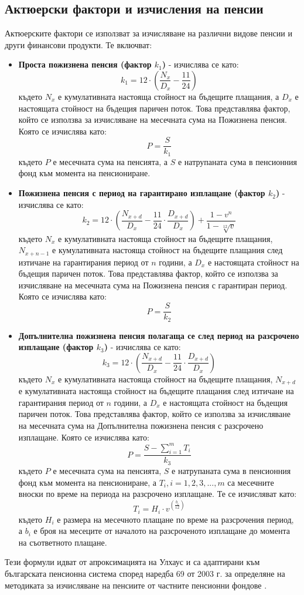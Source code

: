 \documentclass[a4paper,12pt]{article}
\begin{document}
\subsection{Актюерски фактори и изчисления на пенсии}
Актюерските фактори се използват за изчисляване на различни видове пенсии и други финансови продукти. Те включват:
\begin{itemize}
        \item \textbf{Проста пожизнена пенсия (фактор $k_1$)} - изчислява се като:
              \[k_1 = 12\cdot\left(\frac{N_{x}}{D_{x}}-\frac{11}{24}\right)\]
              където $N_x$ е кумулативната настояща стойност на бъдещите плащания, а $D_x$ е настоящата стойност на бъдещия паричен поток. Това представлява фактор, който се използва за изчисляване на месечната сума на Пожизнена пенсия. Която се изчислява като:
              \[P = \frac{S}{k_1}\]
              където $P$ е месечната сума на пенсията, а $S$ е натрупаната сума в пенсионния фонд към момента на пенсиониране.
        \item \textbf{Пожизнена пенсия с  период на гарантирано изплащане (фактор $k_2$)} - изчислява се като:
              \[k_2 = 12\cdot\left(\frac{N_{x+d}}{D_x} - \frac{11}{24}\cdot \frac{D_{x+d}}{D_{x}}\right)+\frac{1-v^n}{1-\sqrt[12]{v}}\]
              където $N_x$ е кумулативната настояща стойност на бъдещите плащания, $N_{x+n-1}$ е кумулативната настояща стойност на бъдещите плащания след изтичане на гарантирания период от $n$ години, а $D_x$ е настоящата стойност на бъдещия паричен поток. Това представлява фактор, който се използва за изчисляване на месечната сума на Пожизнена пенсия с гарантиран период. Която се изчислява като:
              \[P = \frac{S}{k_2}\]
        \item \textbf{Допълнителна пожизнена пенсия полагаща се след период на разсрочено изплащане (фактор $k_3$)} - изчислява се като:
              \[k_3 = 12\cdot\left(\frac{N_{x+d}}{D_{x}} - \frac{11}{24}\cdot\frac{
                              D_{x+d}}{D_{x}}\right)\]
              където $N_x$ е кумулативната настояща стойност на бъдещите плащания, $N_{x+d}$ е кумулативната настояща стойност на бъдещите плащания след изтичане на гарантирания период от $n$ години, а $D_x$ е настоящата стойност на бъдещия паричен поток. Това представлява фактор, който се използва за изчисляване на месечната сума на Допълнителна пожизнена пенсия с разсрочено изплащане. Която се изчислява като:
              \[P = \frac{S-\sum_{i=1}^{m}T_i}{k_3}\]
              където $P$ е месечната сума на пенсията, $S$ е натрупаната сума в пенсионния фонд към момента на пенсиониране, а $T_i,i=1,2,3,...,m$ са месечните вноски по време на периода на разсрочено изплащане. Те се изчисляват като:
              \[T_i= H_i \cdot v^{(\frac{b_i}{12})}\]
              където $H_i$ е размера на месечното плащане по време на разсрочения период, а $b_i$ е броя на месеците от началото на разсроченото изплащане до момента на съответното плащане.
\end{itemize}
Тези формули идват от апроксимацията на Улхаус \cite{ulhous1956} и са адаптирани към българската пенсионна система според наредба 69 от 2003 г. за определяне на методиката за изчисляване на пенсиите от частните пенсионни фондове \cite{NOI_Official}.
\end{document}
